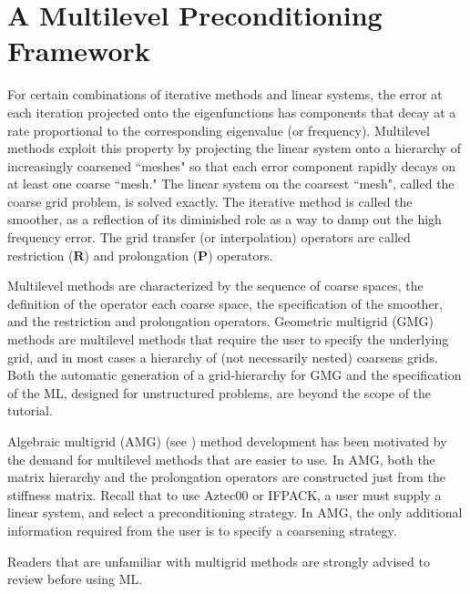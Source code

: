 \section{A Multilevel Preconditioning Framework}
\label{ml:theoretical}
For certain combinations of iterative methods and linear systems, the
error at each iteration projected onto the eigenfunctions has components
that decay at a rate proportional to the corresponding eigenvalue (or
frequency).  Multilevel methods exploit this property \cite{Briggs2000}
by projecting the linear system onto a hierarchy of increasingly
coarsened ``meshes" so that each error component rapidly decays on at
least one coarse ``mesh."  The linear system on the coarsest ``mesh",
called the coarse grid problem, is solved exactly.  The iterative method
is called the smoother, as a reflection of its diminished role as a way
to damp out the high frequency error.  The grid transfer (or
interpolation) operators are called restriction ($\mathbf{R}$) and
prolongation ($\mathbf{P}$) operators.

Multilevel methods are characterized by 
the sequence of coarse spaces, 
the definition of the operator each coarse space,
the specification of the smoother, and the 
restriction and prolongation operators.
Geometric multigrid (GMG) methods  are multilevel methods 
that require the user to specify the underlying grid, and
in most cases a hierarchy of (not necessarily nested) coarsens grids.
Both the automatic generation of a grid-hierarchy for GMG and the 
specification of the ML, designed for unstructured problems,
are beyond the scope of the tutorial.

Algebraic multigrid (AMG)  (see \cite[Section 8]{Briggs2000}) 
method development has been motivated by the demand for multilevel
methods that are easier to use.
In AMG, both the matrix hierarchy and the prolongation operators are
constructed just from the stiffness matrix.  
Recall that to use Aztec00 or IFPACK,  a user must 
supply a linear system, and select a preconditioning strategy.
In AMG, the only additional information required 
from the user is to specify a coarsening strategy.

Readers that are unfamiliar with multigrid methods are strongly advised to
review \cite{Briggs2000} before using ML.

